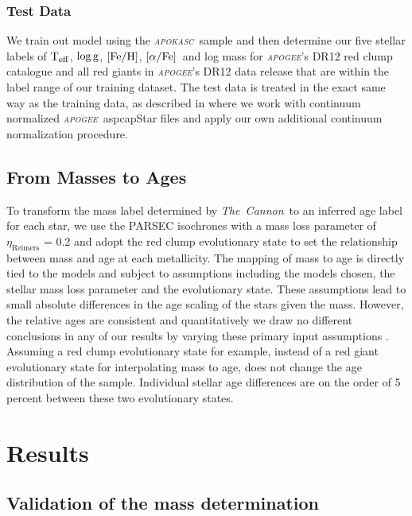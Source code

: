 \documentclass[12pt, preprint]{aastex}
\newcommand{\project}[1]{\textsl{#1}}
\newcommand{\tc}{\project{The~Cannon}}
\newcommand{\apogee}{\project{\textsc{apogee}}}
\newcommand{\apokasc}{\project{\textsc{apokasc}}}
\newcommand{\teff}{\mbox{$\rm T_{eff}$}}
\newcommand{\feh}{\mbox{$\rm [Fe/H]$}}
\newcommand{\alphafe}{\mbox{$\rm [\alpha/Fe]$}}
\newcommand{\logg}{\mbox{$\rm \log g$}}
\begin{document}
\subsubsection{Test Data} 

We train out model using the \apokasc\ sample and then determine our five stellar labels of \teff, \logg, \feh, \alphafe\ and log mass for \apogee's DR12 red clump catalogue \citet{Bovy2014} and all red giants in \apogee's DR12 data release that are within the label range of our training dataset.  The test data is treated in the exact same way as the training data, as described in \citet{Ness2015} where we work with continuum normalized \apogee\ aspcapStar files and apply our own additional continuum normalization procedure. 

\subsection{From Masses to Ages}

To transform the mass label determined by \tc\ to an inferred age label for each star, we use the PARSEC isochrones with a mass loss parameter of $\eta_{\mbox{Reimers}}$ = 0.2 and adopt the red clump evolutionary state to set the relationship between mass and age at each metallicity.  The mapping of mass to age is directly tied to the models and subject to assumptions including the models chosen, the stellar mass loss parameter and the evolutionary state. These assumptions lead to small absolute differences in the age scaling of the stars given the mass. However,  the relative ages are consistent and quantitatively we draw no different conclusions in any of our results by varying these primary input assumptions \citep[see also][]{Bovy2014}. Assuming a red clump evolutionary state for example, instead of a red giant evolutionary state for interpolating mass to age, does not change the age distribution of the sample. Individual stellar age differences are on the order of 5\,percent between these two evolutionary states. 

\section{Results}

\subsection{Validation of the mass determination}
\end{document}
